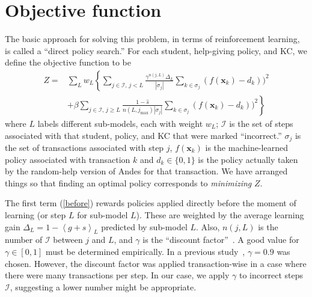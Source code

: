 \documentclass[11pt,letterpaper]{article}
\begin{document}
\section{Objective function}

The basic approach for solving this problem, in terms of reinforcement
learning, is called a ``direct policy search.''
For each student, help-giving policy, and KC, we define the objective 
function to be 
%
\begin{subequations}
  \label{objective}
  \begin{align}
  Z =& \sum_L w_L \left\{\sum_{j \in \mathcal{I},\,j<L}  
       \frac{\gamma^{n(j,L)} \Delta_L}{\left|\sigma_j\right|}
  \sum_{k\in \sigma_j} \left(f(\mathbf{x}_k)-d_k\right))^2 \right.
     \label{before} \\
  &+\beta \left. \sum_{j \in \mathcal{I},\,j \ge L} \frac{1-\hat{s}}
      {n(L,j_\mathrm{max})\left|\sigma_j\right|}
             \sum_{k\in \sigma_j} \left(f(\mathbf{x}_k)-d_k\right))^2
     \right\}
  \label{after}
  \end{align}
\end{subequations}
%
where $L$ labels different sub-models, each with weight $w_L$;
$\mathcal{I}$ is the set of steps associated
with that student, policy, and KC that were marked ``incorrect.''  
$\sigma_j$ is the set of transactions associated with step $j$,
$f(\mathbf{x}_k)$ is the machine-learned policy associated
with transaction $k$ and
$d_k\in \{0,1\}$ is the
policy actually taken by the random-help version of Andes for that 
transaction.
We have arranged things so that finding an optimal policy 
corresponds to {\em minimizing} $Z$.

The first term (\ref{before}) rewards policies applied directly before
the moment of learning (or step $L$ for sub-model $L$).  
These are weighted by the 
average learning gain $\Delta_L = 1-\left\langle g+s\right\rangle_L$ 
predicted by sub-model $L$.
Also, $n(j,L)$ is the number
of $\mathcal{I}$ between $j$ and $L$, 
and $\gamma$ is the ``discount factor''~\cite{ml}. 
A good value for $\gamma \in [0,1]$ must be determined empirically.
In a previous study~\cite{mint}, $\gamma=0.9$ was chosen.
However, the discount factor was applied transaction-wise in 
a case where there were many transactions per step.  In our case, 
we apply $\gamma$ to incorrect steps $\mathcal{I}$, suggesting a lower
number might be appropriate.
\end{document}
